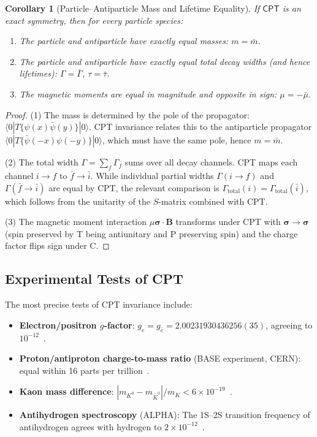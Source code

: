 \documentclass[12pt]{article}
\newtheorem{corollary}[theorem]{Corollary}
\theoremstyle{definition}
\theoremstyle{remark}
\newcommand{\CPT}{\mathsf{CPT}}
\newcommand{\psibar}{\bar{\psi}}
\newcommand{\bra}[1]{\langle #1 |}
\newcommand{\ket}[1]{| #1 \rangle}
\begin{document}
\begin{corollary}[Particle--Antiparticle Mass and Lifetime Equality]
\label{cor:mass_equality}
If $\CPT$ is an exact symmetry, then for every particle species:
\begin{enumerate}
    \item The particle and antiparticle have \emph{exactly} equal masses: $m = \bar{m}$.
    \item The particle and antiparticle have \emph{exactly} equal total decay widths
    (and hence lifetimes): $\Gamma = \bar{\Gamma}$, $\tau = \bar{\tau}$.
    \item The magnetic moments are equal in magnitude and opposite in sign:
    $\mu = -\bar{\mu}$.
\end{enumerate}
\end{corollary}

\begin{proof}
(1) The mass is determined by the pole of the propagator:
$\bra{0}T\{\psi(x)\psibar(y)\}\ket{0}$. CPT invariance relates this to the
antiparticle propagator $\bra{0}T\{\psibar(-x)\psi(-y)\}\ket{0}$, which must
have the same pole, hence $m = \bar{m}$.

(2) The total width $\Gamma = \sum_f \Gamma_f$ sums over all decay channels.
CPT maps each channel $i \to f$ to $\bar{f} \to \bar{i}$. While individual
partial widths $\Gamma(i \to f)$ and $\Gamma(\bar{f} \to \bar{i})$ are equal
by CPT, the relevant comparison is $\Gamma_{\text{total}}(i) = \Gamma_{\text{total}}(\bar{i})$,
which follows from the unitarity of the $S$-matrix combined with CPT.

(3) The magnetic moment interaction $\mu \boldsymbol{\sigma} \cdot \mathbf{B}$ transforms
under CPT with $\boldsymbol{\sigma} \to \boldsymbol{\sigma}$ (spin preserved by T
being antiunitary and P preserving spin) and the charge factor flips sign under C.
\end{proof}

\subsection{Experimental Tests of CPT}

The most precise tests of CPT invariance include:
\begin{itemize}
    \item \textbf{Electron/positron $g$-factor}: $g_e = g_{\bar{e}} = 2.00231930436256(35)$,
    agreeing to $10^{-12}$~\cite{Hanneke2008}.
    \item \textbf{Proton/antiproton charge-to-mass ratio} (BASE experiment, CERN):
    equal within 16 parts per trillion~\cite{BASE2022}.
    \item \textbf{Kaon mass difference}: $|m_{K^0} - m_{\bar{K}^0}|/m_K < 6 \times 10^{-19}$~\cite{PDG2024}.
    \item \textbf{Antihydrogen spectroscopy} (ALPHA): The 1S--2S transition frequency
    of antihydrogen agrees with hydrogen to $2 \times 10^{-12}$~\cite{ALPHA2020}.
\end{itemize}
\end{document}
